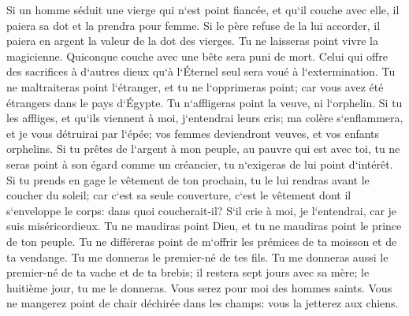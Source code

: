 \verse Si un homme séduit une vierge qui n`est point fiancée, et qu`il couche avec elle, il paiera sa dot et la prendra pour femme. 
\verse Si le père refuse de la lui accorder, il paiera en argent la valeur de la dot des vierges. 
\verse Tu ne laisseras point vivre la magicienne. 
\verse Quiconque couche avec une bête sera puni de mort. 
\verse Celui qui offre des sacrifices à d`autres dieux qu`à l`Éternel seul sera voué à l`extermination. 
\verse Tu ne maltraiteras point l`étranger, et tu ne l`opprimeras point; car vous avez été étrangers dans le pays d`Égypte. 
\verse Tu n`affligeras point la veuve, ni l`orphelin. 
\verse Si tu les affliges, et qu`ils viennent à moi, j`entendrai leurs cris; 
\verse ma colère s`enflammera, et je vous détruirai par l`épée; vos femmes deviendront veuves, et vos enfants orphelins. 
\verse Si tu prêtes de l`argent à mon peuple, au pauvre qui est avec toi, tu ne seras point à son égard comme un créancier, tu n`exigeras de lui point d`intérêt. 
\verse Si tu prends en gage le vêtement de ton prochain, tu le lui rendras avant le coucher du soleil; 
\verse car c`est sa seule couverture, c`est le vêtement dont il s`enveloppe le corps: dans quoi coucherait-il? S`il crie à moi, je l`entendrai, car je suis miséricordieux. 
\verse Tu ne maudiras point Dieu, et tu ne maudiras point le prince de ton peuple. 
\verse Tu ne différeras point de m`offrir les prémices de ta moisson et de ta vendange. Tu me donneras le premier-né de tes fils. 
\verse Tu me donneras aussi le premier-né de ta vache et de ta brebis; il restera sept jours avec sa mère; le huitième jour, tu me le donneras. 
\verse Vous serez pour moi des hommes saints. Vous ne mangerez point de chair déchirée dans les champs: vous la jetterez aux chiens. 

